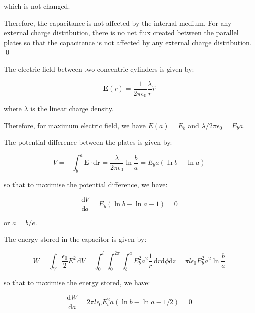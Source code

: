 \documentclass[12pt]{article}
\begin{document}
which is not changed.

Therefore, the capacitance is not affected by the internal medium. For any external charge distribution, there is no net flux created between the parallel plates so that the capacitance is not affected by any external charge distribution.
\qed


The electric field between two concentric cylinders is given by:

\begin{equation}
    \mathbf{E}(r) = \frac{1}{2\pi \epsilon_{0}} \frac{\lambda}{r} \hat{r}
\end{equation}

where $\lambda$ is the linear charge density.

Therefore, for maximum electric field, we have $E(a) = E_{b}$ and $\lambda/2\pi \epsilon_{0} = E_{b} a$.

The potential difference between the plates is given by:

\begin{equation}
    V = -\int_{b}^{a} \mathbf{E} \cdot \mathrm{d}\mathbf{r} = \frac{\lambda}{2\pi \epsilon_{0}} \ln{\frac{b}{a}} = E_{b} a (\ln{b} - \ln{a})
\end{equation}

so that to maximise the potential difference, we have:

\begin{equation}
    \frac{\mathrm{d}V}{\mathrm{d}a} = E_{b} (\ln{b} - \ln{a} - 1) = 0
\end{equation}

or $a = b/e$.

The energy stored in the capacitor is given by:

\begin{equation}
    W = \int_{V} \frac{\epsilon_{0}}{2} E^{2} \, \mathrm{d}V = \int_{0}^{l} \int_{0}^{2\pi} \int_{b}^{a} E_{b}^{2} a^{2} \frac{1}{r} \, \mathrm{d}r \mathrm{d}\phi \mathrm{d}z = \pi l \epsilon_{0} E_{b}^{2} a^{2} \ln{\frac{b}{a}}
\end{equation}

so that to maximise the energy stored, we have:

\begin{equation}
    \frac{\mathrm{d}W}{\mathrm{d}a} = 2\pi l \epsilon_{0} E_{b}^{2} a \left( \ln{b} - \ln{a} - 1/2 \right) = 0
\end{equation}
\end{document}
